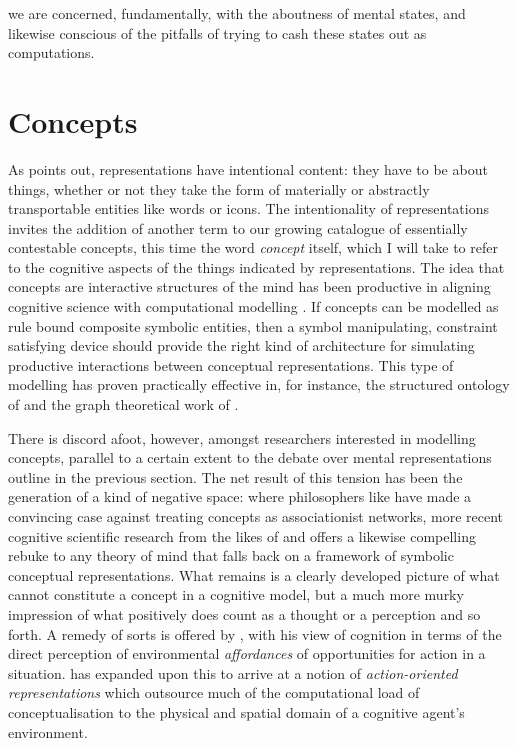 we are concerned, fundamentally, with the aboutness of mental states, and likewise conscious of the pitfalls of trying to cash these states out as computations.

\section{Concepts}
As \cite{Searle1983b} points out, representations have intentional content: they have to be about things, whether or not they take the form of materially or abstractly transportable entities like words or icons.  The intentionality of representations invites the addition of another term to our growing catalogue of essentially contestable concepts, this time the word \emph{concept} itself, which I will take to refer to the cognitive aspects of the things indicated by representations.  The idea that concepts are interactive structures of the mind \citep{MargolisEA2007,Fodor2008} has been productive in aligning cognitive science with computational modelling \citep{Boden2006}.  If concepts can be modelled as rule bound composite symbolic entities, then a symbol manipulating, constraint satisfying device should provide the right kind of architecture for simulating productive interactions between conceptual representations.  This type of modelling has proven practically effective in, for instance, the structured ontology of \cite{Lenat1995} and the graph theoretical work of \cite{Sowa2006}.

There is discord afoot, however, amongst researchers interested in modelling concepts, parallel to a certain extent to the debate over mental representations outline in the previous section.  The net result of this tension has been the generation of a kind of negative space: where philosophers like \cite{FodorEA1988} have made a convincing case against treating concepts as associationist networks, more recent cognitive scientific research from the likes of \cite{Hutto2001} and \cite{Chemero2009} offers a likewise compelling rebuke to any theory of mind that falls back on a framework of symbolic conceptual representations.  What remains is a clearly developed picture of what cannot constitute a concept in a cognitive model, but a much more murky impression of what positively does count as a thought or a perception and so forth.  A remedy of sorts is offered by \cite{Gibson1979}, with his view of cognition in terms of the direct perception of environmental \emph{affordances} of opportunities for action in a situation.  \cite{Clark1997} has expanded upon this to arrive at a notion of \emph{action-oriented representations} which outsource much of the computational load of conceptualisation to the physical and spatial domain of a cognitive agent's environment.

